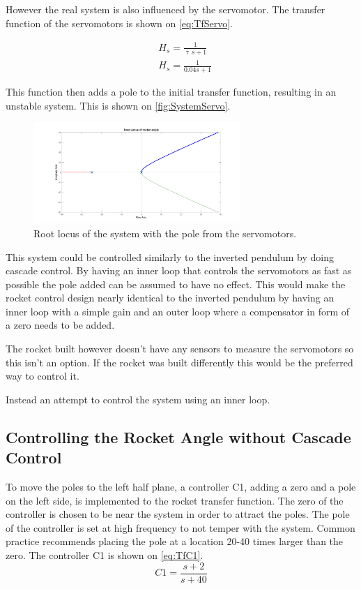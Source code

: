 However the real system is also influenced by the servomotor. The transfer function of the servomotors is shown on \autoref{eq:TfServo}. 

\begin{subequations}
	\begin{flalign}
& H_s = \frac{1}{\uptau s+ 1}	\\
& H_s = \frac{1}{0.04s + 1}
\label{eq:TfServo}
	\end{flalign}
\end{subequations}
\startexplain
{}
\stopexplain

This function then adds a pole to the initial transfer function, resulting in an unstable system. This is shown on \autoref{fig:SystemServo}.
\begin{figure}[htbp]
\centering
\includegraphics[width=0.7\textwidth]{figures/Rocket/design/tf_with_servo_vf}
\caption{Root locus of the system with the pole from the servomotors.}
\label{fig:SystemServo}
\end{figure}

This system could be controlled similarly to the inverted pendulum by doing cascade control. By having an inner loop that controls the servomotors as fast as possible the pole added can be assumed to have no effect. This would make the rocket control design nearly identical to the inverted pendulum by having an inner loop with a simple gain and an outer loop where a compensator in form of a zero needs to be added. 

The rocket built however doesn't have any sensors to measure the servomotors so this isn't an option. If the rocket was built differently this would be the preferred way to control it.

Instead an attempt to control the system using an inner loop.

\subsection{Controlling the Rocket Angle without Cascade Control}
To move the poles to the left half plane, a controller C1, adding a zero and a pole on the left side, is implemented to the rocket transfer function. The zero of the controller is chosen to be near the system in order to attract the poles. The pole of the controller is set at high frequency to not temper with the system. Common practice recommends placing the pole at a location 20-40 times larger than the zero. The controller C1 is shown on \autoref{eq:TfC1}.
\begin{equation}
C1 = \frac{s + 2}{s + 40}	\label{eq:TfC1}
\end{equation}

